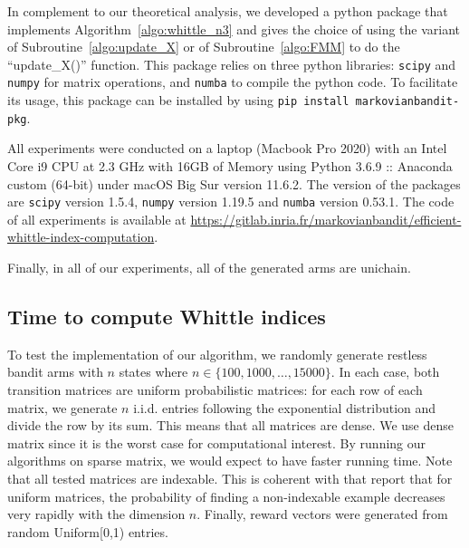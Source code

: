 In complement to our theoretical analysis, we developed a python package that implements Algorithm~\ref{algo:whittle_n3} and gives the choice of using the variant of Subroutine~\ref{algo:update_X} or of Subroutine~\ref{algo:FMM} to do the ``update\_X()'' function. This package relies on three python libraries: \texttt{scipy} and \texttt{numpy} for matrix operations, and \texttt{numba} to compile the python code. To facilitate its usage, this package can be installed by using \texttt{pip install markovianbandit-pkg}.

All experiments were conducted on a laptop (Macbook Pro 2020) with an Intel Core i9 CPU at 2.3 GHz with 16GB of Memory using Python 3.6.9 :: Anaconda custom (64-bit) under macOS Big Sur version 11.6.2. The version of the packages are \texttt{scipy} version 1.5.4, \texttt{numpy} version 1.19.5 and \texttt{numba} version 0.53.1. The code of all experiments is available at \url{https://gitlab.inria.fr/markovianbandit/efficient-whittle-index-computation}.

Finally, in all of our experiments, all of the generated arms are unichain.


\subsection{Time to compute Whittle indices}

To test the implementation of our algorithm, we randomly generate restless bandit arms with $n$ states where $n\in\{100,1000,\dots,15000\}$. In each case, both transition matrices are uniform probabilistic matrices: for each row of each matrix, we generate $n$ i.i.d. entries following the exponential distribution and divide the row by its sum. This means that all matrices are dense.
We use dense matrix since it is the worst case for computational interest. By running our algorithms on sparse matrix, we would expect to have faster running time.
Note that all tested matrices are indexable. This is coherent with \cite{gast2020exponential,nino2007dynamic} that report that for uniform matrices, the probability of finding a non-indexable example decreases very rapidly with the dimension $n$. Finally, reward vectors were generated from random Uniform[0,1) entries.

